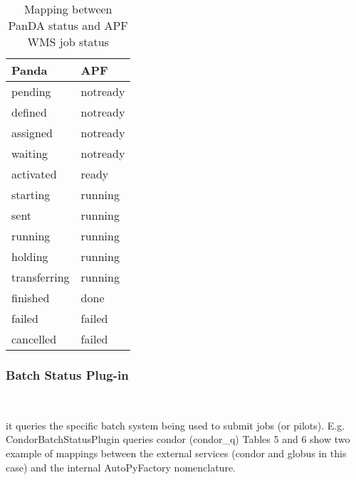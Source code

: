 \documentclass[a4paper]{jpconf}
\begin{document}
\begin{table}
   \begin{center}
      \begin{tabular}{l l}
         \hline
         \textbf{Panda}         & \textbf{APF}       \\
         \hline
         pending       & notready  \\ 
         defined       & notready  \\ 
         assigned      & notready  \\ 
         waiting       & notready  \\ 
         activated     & ready     \\ 
         starting      & running   \\ 
         sent          & running   \\ 
         running       & running   \\ 
         holding       & running   \\ 
         transferring  & running   \\ 
         finished      & done      \\ 
         failed        & failed    \\ 
         cancelled     & failed    \\ 
         \hline
      \end{tabular}
   \end{center}
   \caption{Mapping between PanDA status and APF WMS job status}
   \label{translation}
\end{table}


\subsubsection{Batch Status Plug-in}

~

\noindent it queries the specific batch system being used to submit jobs (or pilots). 
E.g. CondorBatchStatusPlugin queries condor (condor\_q)
Tables 5 and 6 show two example of mappings between the external services (condor and globus in this case)
and the internal AutoPyFactory nomenclature.
\end{document}
